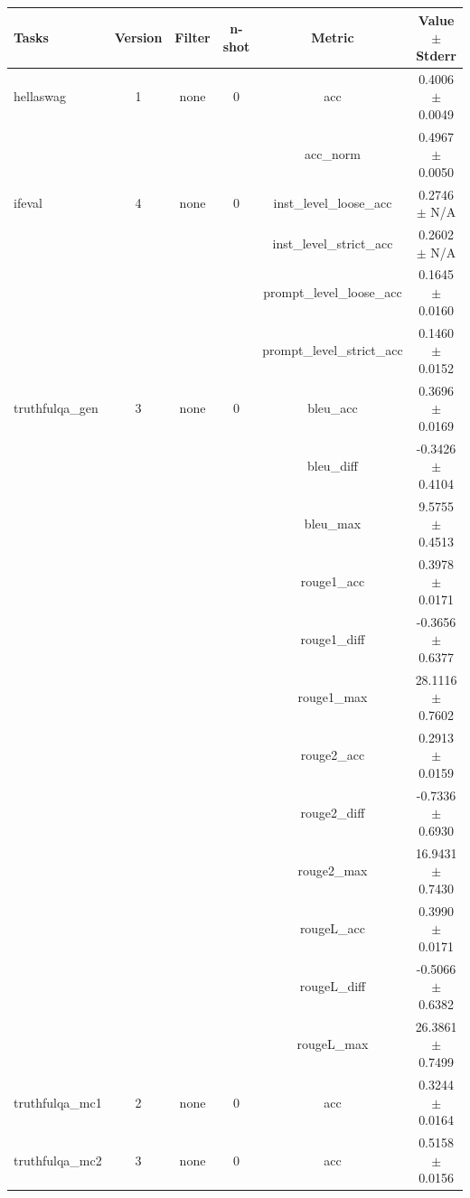 \documentclass{ifacconf}
\begin{document}
\begin{strip}
\begin{minipage}{\textwidth}
			\begin{table}[H]
				\centering
				\begin{tabular}{|l|c|c|c|c|c|}
					\hline
					\textbf{Tasks} & \textbf{Version} & \textbf{Filter} & \textbf{n-shot} & \textbf{Metric} & \textbf{Value} $\pm$ \textbf{Stderr} \\ \hline
					hellaswag & 1 & none & 0 & acc & 0.4006 $\pm$ 0.0049 \\ \hline
					& & & & acc\_norm & 0.4967 $\pm$ 0.0050 \\ \hline
					ifeval & 4 & none & 0 & inst\_level\_loose\_acc & 0.2746 $\pm$ N/A \\ \hline
					& & & & inst\_level\_strict\_acc & 0.2602 $\pm$ N/A \\ \hline
					& & & & prompt\_level\_loose\_acc & 0.1645 $\pm$ 0.0160 \\ \hline
					& & & & prompt\_level\_strict\_acc & 0.1460 $\pm$ 0.0152 \\ \hline
					truthfulqa\_gen & 3 & none & 0 & bleu\_acc & 0.3696 $\pm$ 0.0169 \\ \hline
					& & & & bleu\_diff & -0.3426 $\pm$ 0.4104 \\ \hline
					& & & & bleu\_max & 9.5755 $\pm$ 0.4513 \\ \hline
					& & & & rouge1\_acc & 0.3978 $\pm$ 0.0171 \\ \hline
					& & & & rouge1\_diff & -0.3656 $\pm$ 0.6377 \\ \hline
					& & & & rouge1\_max & 28.1116 $\pm$ 0.7602 \\ \hline
					& & & & rouge2\_acc & 0.2913 $\pm$ 0.0159 \\ \hline
					& & & & rouge2\_diff & -0.7336 $\pm$ 0.6930 \\ \hline
					& & & & rouge2\_max & 16.9431 $\pm$ 0.7430 \\ \hline
					& & & & rougeL\_acc & 0.3990 $\pm$ 0.0171 \\ \hline
					& & & & rougeL\_diff & -0.5066 $\pm$ 0.6382 \\ \hline
					& & & & rougeL\_max & 26.3861 $\pm$ 0.7499 \\ \hline
					truthfulqa\_mc1 & 2 & none & 0 & acc & 0.3244 $\pm$ 0.0164 \\ \hline
					truthfulqa\_mc2 & 3 & none & 0 & acc & 0.5158 $\pm$ 0.0156 \\ \hline
				\end{tabular}
				\label{tab:qwen25_pruned}
			\end{table}
		\end{minipage}
	\end{strip}
	
\end{document}
